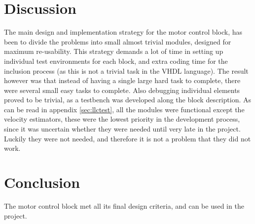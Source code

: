 \section{Discussion}
The main design and implementation strategy for the motor control block, has been to divide the problems into small almost trivial modules, designed for maximum re-usability. This strategy demands a lot of time in setting up individual test environments for each block, and extra coding time for the inclusion process (as this is not a trivial task in the VHDL language). The result however was that instead of having a single large hard task to complete, there were several small easy tasks to complete. Also debugging individual elements proved to be trivial, as a testbench was developed along the block description.
As can be read in appendix \ref{sec:llctest}, all the modules were functional except the velocity estimators, these were the lowest priority in the development process, since it was uncertain whether they were needed until very late in the project. Luckily they were not needed, and therefore it is not a problem that they did not work.

\section{Conclusion}
The motor control block met all its final design criteria, and can be used in the project.





















